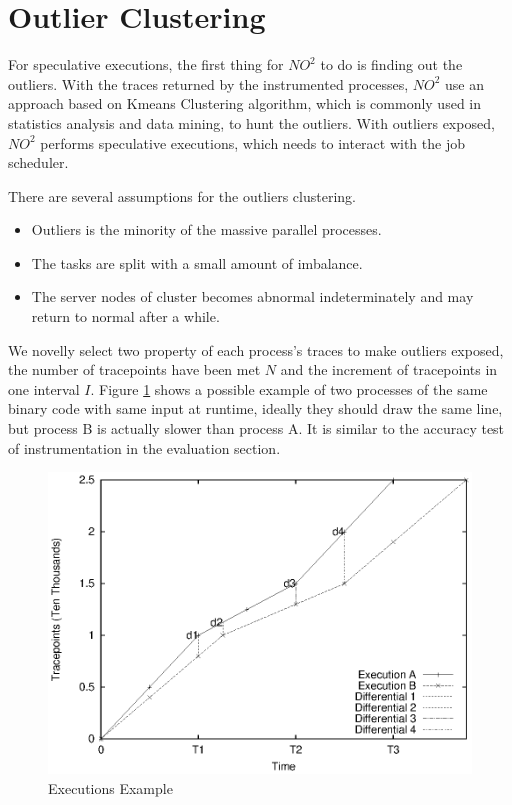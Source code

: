 \section{Outlier Clustering}

For speculative executions, the first thing for $NO^2$ to do is finding out the outliers. With the traces returned by the instrumented processes, $NO^2$ use an approach based on Kmeans Clustering algorithm, which is commonly used in statistics analysis and data mining, to hunt the outliers. With outliers exposed, $NO^2$ performs speculative executions, which needs to interact with the job scheduler.

There are several assumptions for the outliers clustering.

\begin{itemize}
\item Outliers is the minority of the massive parallel processes.
\item The tasks are split with a small amount of imbalance.
\item The server nodes of cluster becomes abnormal indeterminately and may return to normal after a while.
\end{itemize}

We novelly select two property of each process's traces to make outliers exposed, the number of tracepoints have been met $N$ and the increment of tracepoints in one interval $I$. Figure \ref{figure:executionsexample} shows a possible example of two processes of the same binary code with same input at runtime, ideally they should draw the same line, but process B is actually slower than process A. It is similar to the accuracy test of instrumentation in the evaluation section.

\begin{figure}
\centering
\includegraphics[width=0.9\columnwidth]{figures/executions_example.eps}
\caption{Executions Example}
\label{figure:executionsexample}
\end{figure}

